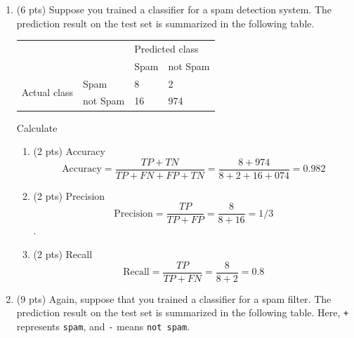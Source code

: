 \documentclass[a4paper]{article}
\theoremstyle{definition}
\newenvironment{soln}{
    \leavevmode\color{blue}\ignorespaces
}{}
\begin{document}
\begin{enumerate}
\begin{enumerate}
        \end{enumerate}

  \item (6 pts) Suppose you trained a classifier for a spam detection system. The prediction result on the test set is summarized in the following table.
        \begin{center}
          \begin{tabular}{l l | l l}
                                          &          & \multicolumn{2}{l}{Predicted class}            \\
                                          &          & Spam                                & not Spam \\
            \hline
            \multirow{2}{*}{Actual class} & Spam     & 8                                   & 2        \\
                                          & not Spam & 16                                  & 974
          \end{tabular}
        \end{center}

        Calculate
        \begin{enumerate}
          \item (2 pts) Accuracy
                \begin{soln}  $$\text{Accuracy} = \dfrac{TP + TN}{TP + FN + FP + TN} = \dfrac{8 + 974}{8+2+16+074} = 0.982 $$ \end{soln}
          \item (2 pts) Precision
                \begin{soln}  $$\text{Precision} = \dfrac{TP}{TP+FP} = \dfrac{8}{8+16} = 1/3 $$. \end{soln}
          \item (2 pts) Recall
                \begin{soln}   $$\text{Recall} = \dfrac{TP}{TP+FN} = \dfrac{8}{8+2} = 0.8 $$ \end{soln}
        \end{enumerate}


  \item (9 pts) Again, suppose that you trained a classifier for a spam filter. The prediction result on the test set is summarized in the following table. Here, {\tt +} represents {\tt spam}, and {\tt -} means {\tt not spam}.


\end{enumerate}
\end{document}
